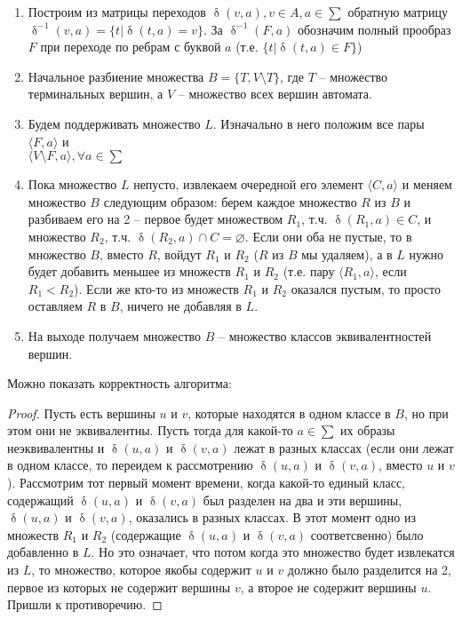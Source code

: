 \begin{enumerate}
\item Построим из матрицы переходов $\updelta(v, a), v \in A, a \in \sum$ обратную матрицу $\updelta^{-1}(v, a) = \{t|\updelta(t, a) = v\}$.
За $\updelta^{-1}(F, a)$ обозначим полный прообраз $F$ при переходе по ребрам с буквой $a$ (т.е. $\{t|\updelta(t, a) \in F\}$)
\item Начальное разбиение множества $B = \{T, V \setminus T\}$,
где $T$ -- множество терминальных вершин, а $V$ -- множество всех вершин автомата.
\item Будем поддерживать множество $L$. Изначально в него положим все пары
$\langle F, a \rangle$ и\\
$\langle V \setminus F, a \rangle, \forall a \in \sum$
\item Пока множество $L$ непусто, извлекаем очередной его элемент $\langle C, a \rangle$ и меняем множество $B$ следующим
образом: берем каждое множество $R$ из $B$ и разбиваем его на 2 -- первое будет множеством $R_1$, т.ч. $\updelta(R_1, a) \in C$, и
множество $R_2$, т.ч. $\updelta(R_2, a) \cap C = \varnothing$. Если они оба не пустые, то в множество $B$, вместо
$R$, войдут $R_1$ и $R_2$ ($R$ из $B$ мы удаляем), а в $L$ нужно будет добавить меньшее из множеств $R_1$ и $R_2$
(т.е. пару $\langle R_1, a \rangle$, если $R_1 < R_2$). Если же кто-то из множеств $R_1$ и $R_2$ оказался пустым, 
то просто оставляем $R$ в $B$, ничего не добавляя в $L$.
\item На выходе получаем множество $B$ -- множество классов эквивалентностей вершин.
\end{enumerate}

\begin{theorem}{}
Можно показать корректность алгоритма:
\end{theorem}

\begin{proof}
Пусть есть вершины $u$ и $v$, которые находятся в одном классе в $B$, но при этом они не эквивалентны. Пусть тогда для какой-то $a \in \sum$ 
их образы неэквивалентны и 
$\updelta(u, a)$ и $\updelta(v, a)$ лежат в разных классах (если они лежат в одном классе, то переидем к рассмотрению $\updelta(u, a)$ и
$\updelta(v, a)$, вместо $u$ и $v$). Рассмотрим тот первый момент времени, когда какой-то единый класс, содержащий $\updelta(u, a)$ и
$\updelta(v, a)$ был разделен на два и эти вершины, $\updelta(u, a)$ и $\updelta(v, a)$, оказались в разных классах. В этот момент одно из
множеств $R_1$ и $R_2$ (содержащие $\updelta(u, a)$ и $\updelta(v, a)$ соответсвенно) было добавленно в $L$. Но это означает, что потом
когда это множество будет извлекатся из $L$, то множество, которое якобы содержит $u$ и $v$ должно было разделится на 2, первое из которых
не содержит вершины $v$, а второе не содержит вершины $u$. Пришли к противоречию.
\end{proof}

